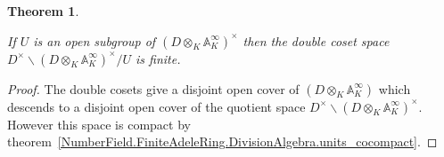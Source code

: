 \documentclass[10pt,a4paper]{article}
\newcommand{\A}{\mathbb{A}}
\newcounter{chapter}
\newtheorem{theorem}{Theorem}[chapter]
\newcommand{\uses}[1]{}
\newcommand{\lean}[1]{}
\newcommand{\leanok}{}
\begin{document}
\begin{theorem}
  \label{NumberField.FiniteAdeleRing.DivisionAlgebra.finiteDoubleCoset}
  \lean{NumberField.FiniteAdeleRing.DivisionAlgebra.finiteDoubleCoset}
  \uses{NumberField.FiniteAdeleRing.DivisionAlgebra.units_cocompact}
  \leanok
  If $U$ is an open subgroup of $(D\otimes_K \A_K^\infty)^\times$
  then the double coset space $D^\times\backslash(D\otimes_K \A_K^\infty)^\times/U$ is finite.
\end{theorem}
\begin{proof}
  \leanok
  The double cosets give a disjoint open cover of $(D\otimes_K \A_K^\infty)$
  which descends to a disjoint open cover of the quotient space
  $D^\times\backslash(D\otimes_K \A_K^\infty)^\times$. However this space is compact
  by theorem~\ref{NumberField.FiniteAdeleRing.DivisionAlgebra.units_cocompact}.
\end{proof}



\end{document}
